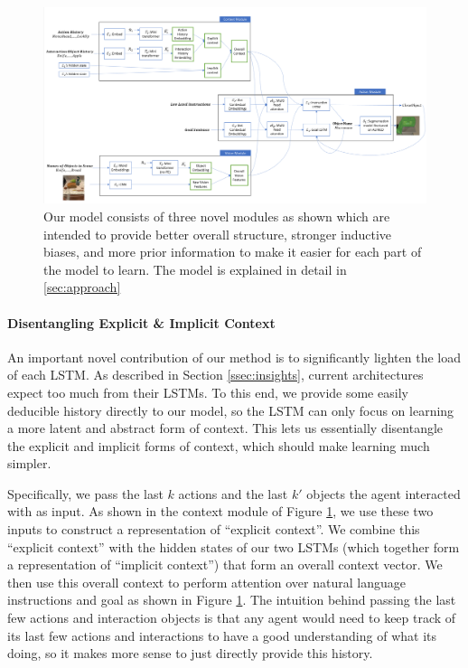 \documentclass[11pt,a4paper]{article}
\begin{document}
\begin{figure}
    \centering
    \includegraphics[width=\linewidth]{figures/tars_model.png}
    \caption{Our model consists of three novel modules as shown which are intended to provide better overall structure, stronger inductive biases, and more prior information to make it easier for each part of the model to learn. The model is explained in detail in \ref{sec:approach}}
    \label{fig:model}
\end{figure}

\paragraph{Disentangling Explicit \& Implicit Context}
An important novel contribution of our method is to significantly lighten the load of each LSTM. As described in Section \ref{ssec:insights}, current architectures expect too much from their LSTMs. To this end, we provide some easily deducible history directly to our model, so the LSTM can only focus on learning a more latent and abstract form of context. This lets us essentially disentangle the explicit and implicit forms of context, which should make learning much simpler.

Specifically, we pass the last $k$ actions and the last $k'$ objects the agent interacted with as input.  As shown in the context module of Figure \ref{fig:model}, we use these two inputs to construct a representation of ``explicit context''. We combine this ``explicit context'' with the hidden states of our two LSTMs (which together form a representation of ``implicit context'') that form an overall context vector. We then use this overall context to perform attention over natural language instructions and goal as shown in Figure \ref{fig:model}. The intuition behind passing the last few actions and interaction objects is that any agent would need to keep track of its last few actions and interactions to have a good understanding of what its doing, so it makes more sense to just directly provide this history.
\end{document}
